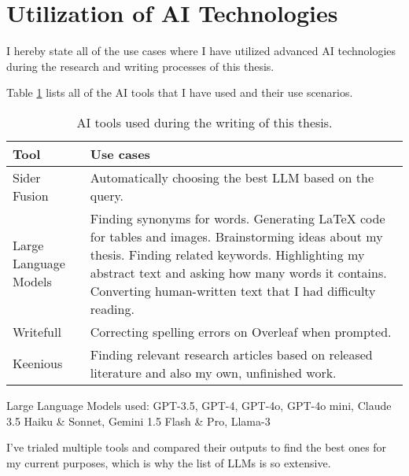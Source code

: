 



\chapter*{Utilization of AI Technologies\label{extra:declaration}}

I hereby state all of the use cases where I have utilized advanced AI technologies during the research and writing processes of this thesis.

Table \ref{table:declaration} lists all of the AI tools that I have used and their use scenarios.

\begin{table}[h]
  \centering
  \begin{tabularx}{\textwidth}{>{\hsize=0.3\hsize}X >{\hsize=0.7\hsize}X}  
    \hline
    \textbf{Tool} & \textbf{Use cases} \\
    \hline
    Sider Fusion & Automatically choosing the best LLM based on the query. \\
    \hline
    Large Language Models & Finding synonyms for words. Generating LaTeX code for tables and images. Brainstorming ideas about my thesis. Finding related keywords. Highlighting my abstract text and asking how many words it contains. Converting human-written text that I had difficulty reading.\\
    \hline
    Writefull& Correcting spelling errors on Overleaf when prompted. \\
    \hline
    Keenious & Finding relevant research articles based on released literature and also my own, unfinished work. \\
    \hline
  \end{tabularx}
  \caption{AI tools used during the writing of this thesis.}
  \label{table:declaration}
\end{table}

Large Language Models used: GPT-3.5, GPT-4, GPT-4o, GPT-4o mini, Claude 3.5 Haiku \& Sonnet, Gemini 1.5 Flash \& Pro, Llama-3

I've trialed multiple tools and compared their outputs to find the best ones for my current purposes, which is why the list of LLMs is so extensive.